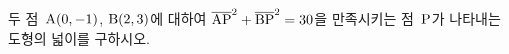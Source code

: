 두 점~$\mathrm{A}(0{,}\mkern3mu\mathopen{}-1)$, $\mathrm{B}(2{,}\mkern3mu\mathopen{}3)$에 대하여 $\overline{\mathrm{AP}}^2+\overline{\mathrm{BP}}^2=30$을 만족시키는 점~$\mathrm{P}$가 나타내는 도형의 넓이를 구하시오.
